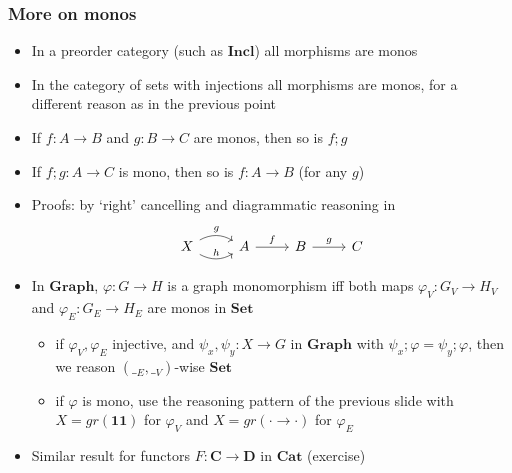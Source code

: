 \documentclass[handout]{beamer}
\newcommand{\bfsf}[1]{{\boldsymbol{#1}}}
\newcommand{\Set}{\bfsf{Set}}
\newcommand{\Gra}{\bfsf{Graph}}
\newcommand{\CC}{\bfsf{C}}
\newcommand{\DD}{\bfsf{D}}
\newcommand{\Incl}{\bfsf{Incl}}
\newcommand{\Cat}{\bfsf{Cat}}
\begin{document}
\frame
  {   
    \frametitle{More on monos}\label{Ch4:Moronmonos}

 \begin{itemize}[<+->]
\item In a preorder category (such as $\Incl$) all morphisms are monos
\item In the category of sets with injections all morphisms are monos,
for a different reason as in the previous point
\item If $f:A\to B$ and $g:B\to C$ are monos, then so is $f;g$
\item If $f;g: A\to C$ is mono, then so is $f:A\to B$ (for any $g$)
\item Proofs: by `right' cancelling  and diagrammatic reasoning in
\[
\begin{tikzcd}[ampersand replacement=\&]
X \arrow[bend left]{r}{g}\arrow[bend right]{r}{h} \& 
A \arrow{r}{f}\& B \arrow{r}{g} \& C
\end{tikzcd}
\]
\item In $\Gra$, $\varphi: G\to H$ is a graph monomorphism iff both
maps $\varphi_V: G_V\to H_V$ and $\varphi_E: G_E\to H_E$ are monos in $\Set$
 \begin{itemize}
    \item if $\varphi_V,\varphi_E$ injective, and $\psi_x,\psi_y: X\to G$ in $\Gra$
with $\psi_x;\varphi = \psi_y;\varphi$, then we reason $(\__E,\__V)$-wise $\Set$
    \item if $\varphi$ is mono, use the reasoning pattern  of the previous
slide with $X=gr(\bfsf{1\!\!1})$ for $\varphi_V$ and $X=gr({\cdot}{\to}{\cdot})$ for $\varphi_E$
\end{itemize}
\item Similar result for functors $F: \CC\to\DD$ in $\Cat$ (exercise)
 \end{itemize}

 }
\end{document}
